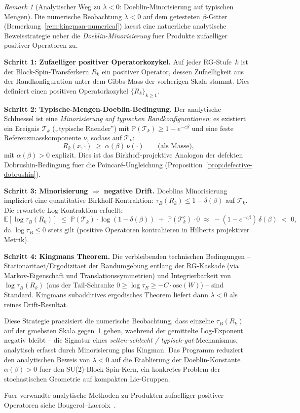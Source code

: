 \documentclass[12pt,a4paper]{article}
\theoremstyle{definition}
\theoremstyle{plain}
\theoremstyle{remark}
\newtheorem{remark}[definition]{Remark}
\begin{document}
\begin{remark}[Analytischer Weg zu $\lambda < 0$: Doeblin-Minorisierung auf typischen Mengen]
\label{rem:doeblin-analytical}
Die numerische Beobachtung $\lambda < 0$ auf dem getesteten $\beta$-Gitter (Bemerkung~\ref{rem:kingman-numerical}) laesst eine natuerliche analytische Beweisstrategie ueber die \emph{Doeblin-Minorisierung} fuer Produkte zufaelliger positiver Operatoren zu.

\textbf{Schritt 1: Zufaelliger positiver Operatorkozykel.} Auf jeder RG-Stufe~$k$ ist der Block-Spin-Transferkern $R_k$ ein positiver Operator, dessen Zufaelligkeit aus der Randkonfiguration unter dem Gibbs-Mass der vorherigen Skala stammt. Dies definiert einen positiven Operatorkozykel $\{R_k\}_{k \geq 1}$.

\textbf{Schritt 2: Typische-Mengen-Doeblin-Bedingung.} Der analytische Schluessel ist eine \emph{Minorisierung auf typischen Randkonfigurationen}: es existiert ein Ereignis $\mathcal{T}_k$ (,,typische Raender'') mit $\mathbb{P}(\mathcal{T}_k) \geq 1 - e^{-c\beta}$ und eine feste Referenzmasskomponente $\nu$, sodass auf $\mathcal{T}_k$:
\[
R_k(x, \cdot) \;\geq\; \alpha(\beta)\, \nu(\cdot) \qquad \text{(als Masse),}
\]
mit $\alpha(\beta) > 0$ explizit. Dies ist das Birkhoff-projektive Analogon der defekten Dobrushin-Bedingung fuer die Poincar\'e-Ungleichung (Proposition~\ref{prop:defective-dobrushin}).

\textbf{Schritt 3: Minorisierung $\Rightarrow$ negative Drift.} Doeblins Minorisierung impliziert eine quantitative Birkhoff-Kontraktion: $\tau_B(R_k) \leq 1 - \delta(\beta)$ auf $\mathcal{T}_k$. Die erwartete Log-Kontraktion erfuellt:
\[
\mathbb{E}[\log \tau_B(R_k)] \;\leq\; \mathbb{P}(\mathcal{T}_k) \cdot \log(1 - \delta(\beta)) \;+\; \mathbb{P}(\mathcal{T}_k^c) \cdot 0 \;\approx\; -(1 - e^{-c\beta})\, \delta(\beta) \;<\; 0,
\]
da $\log \tau_B \leq 0$ stets gilt (positive Operatoren kontrahieren in Hilberts projektiver Metrik).

\textbf{Schritt 4: Kingmans Theorem.} Die verbleibenden technischen Bedingungen -- Stationaritaet/Ergodizitaet der Randumgebung entlang der RG-Kaskade (via Markov-Eigenschaft und Translationssymmetrien) und Integrierbarkeit von $\log \tau_B(R_k)$ (aus der Tail-Schranke $0 \geq \log \tau_B \geq -C \cdot \mathrm{osc}(W)$) -- sind Standard. Kingmans subadditives ergodisches Theorem liefert dann $\lambda < 0$ als reines Drift-Resultat.

Diese Strategie praezisiert die numerische Beobachtung, dass einzelne $\tau_B(R_k)$ auf der groebsten Skala gegen~1 gehen, waehrend der gemittelte Log-Exponent negativ bleibt -- die Signatur eines \emph{selten-schlecht / typisch-gut}-Mechanismus, analytisch erfasst durch Minorisierung plus Kingman. Das Programm reduziert den analytischen Beweis von $\lambda < 0$ auf die Etablierung der Doeblin-Konstante $\alpha(\beta) > 0$ fuer den SU(2)-Block-Spin-Kern, ein konkretes Problem der stochastischen Geometrie auf kompakten Lie-Gruppen.

Fuer verwandte analytische Methoden zu Produkten zufaelliger positiver Operatoren siehe Bougerol--Lacroix~\cite{BougerolLacroix1985}.
\end{remark}
\end{document}

